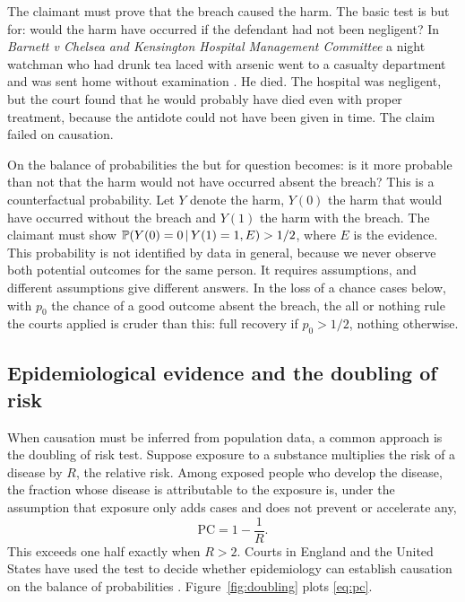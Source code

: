 The claimant must prove that the breach caused the harm. The basic test is but for: would the harm have occurred if the defendant had not been negligent? In \emph{Barnett v Chelsea and Kensington Hospital Management Committee} a night watchman who had drunk tea laced with arsenic went to a casualty department and was sent home without examination \citep{barnett1969}. He died. The hospital was negligent, but the court found that he would probably have died even with proper treatment, because the antidote could not have been given in time. The claim failed on causation.

On the balance of probabilities the but for question becomes: is it more probable than not that the harm would not have occurred absent the breach? This is a counterfactual probability. Let $Y$ denote the harm, $Y(0)$ the harm that would have occurred without the breach and $Y(1)$ the harm with the breach. The claimant must show $\mathbb{P}(Y(0) = 0 \,\vert\, Y(1) = 1, E) > 1/2$, where $E$ is the evidence. This probability is not identified by data in general, because we never observe both potential outcomes for the same person. It requires assumptions, and different assumptions give different answers. In the loss of a chance cases below, with $p_0$ the chance of a good outcome absent the breach, the all or nothing rule the courts applied is cruder than this: full recovery if $p_0 > 1/2$, nothing otherwise.

\subsection{Epidemiological evidence and the doubling of risk}

When causation must be inferred from population data, a common approach is the doubling of risk test. Suppose exposure to a substance multiplies the risk of a disease by $R$, the relative risk. Among exposed people who develop the disease, the fraction whose disease is attributable to the exposure is, under the assumption that exposure only adds cases and does not prevent or accelerate any,
\begin{equation}
\mathrm{PC} = 1 - \frac{1}{R}.
\label{eq:pc}
\end{equation}
This exceeds one half exactly when $R > 2$. Courts in England and the United States have used the test to decide whether epidemiology can establish causation on the balance of probabilities \citep{greenland1999}. Figure~\ref{fig:doubling} plots \eqref{eq:pc}.


